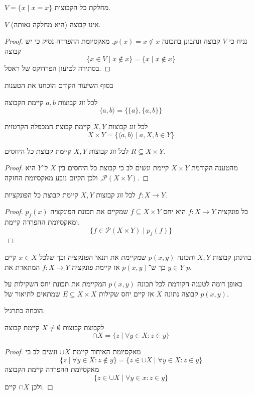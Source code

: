 \begin{notation}
	$V = \{ x \mid x = x \}$ מחלקת כל הקבוצות.
\end{notation}
\begin{proposition}
	$V$ אינו קבוצה (היא מחלקה נאותה).
\end{proposition}
\begin{proof}
	נניח כי $V$ קבוצה ונתבונן בתכונה $p(x) = x \notin x$, מאקסיומת ההפרדה נסיק כי יש קבוצה
	\[
		\{ x \in V \mid x \notin x \} = \{ x \mid x \notin x \}
	\]
	בסתירה לטיעון הפרדוקס של ראסל.
\end{proof}
בסוף השיעור הקודם הוכחנו את הטענות
\begin{proposition}
	לכל זוג קבוצות $a, b$ קיימת הקבוצה
	\[
		\langle a, b \rangle = \{ \{a\}, \{a, b\} \}
	\]
\end{proposition}
\begin{proposition}
	לכל זוג קבוצות $X, Y$ קיימת קבוצת המכפלה הקרטזית
	\[
		X \times Y = \{ \langle a, b \rangle \mid a, X, b \in Y \}
	\]
\end{proposition}
\begin{proposition}
	לכל זוג קבוצות $X, Y$ קיימת קבוצת כל היחסים $R \subseteq X \times Y$.
\end{proposition}
\begin{proof}
	מהטענה הקודמת $X \times Y$ קיימת ונשים לב כי קבוצת כל היחסים בין $X$ ל־$Y$ היא $\mathcal{P}(X \times Y)$, ולכן הקיום נובע מאקסיומת החזקה.
\end{proof}
\begin{proposition}
	לכל זוג קבוצות $X, Y$ קיימת קבוצת כל הפונקציות $f : X \to Y$.
\end{proposition}
\begin{proof}
	כל פונקציה $f : X \to Y$ היא יחס $f \subseteq X \times Y$ שמקיים את תכונת הפונקציה $p_f(x)$ ומאקסיומת ההפרדה קיימת.
	\[
		\{ f \in \mathcal{P}(X \times Y) \mid p_f(f) \}
	\]
\end{proof}
\begin{proposition}
	בהינתן קבוצות $X, Y$ ותכונה $p(x, y)$ שמקיימת את תנאי הפונקציה וכך שלכל $x \in X$ קיים $y \in Y$ כך ש־$p(x, y)$ אז קיימת פונקציה $f : X \to Y$ המתארת את  $p$.
\end{proposition}
\begin{proposition}
	באופן דומה לטענה הקודמת לכל תכונה $p(x, y)$ המקיימת את תכונת יחס השקילות על קבוצה נתונה $X$ אז קיים יחס שקילות $E \subseteq X \times X$ שמתאים לתיאור של $p(x, y)$.
\end{proposition}
הוכחה כתרגיל.
\begin{proposition}
	לקבוצת קבוצות $X \ne \emptyset$ קיימת קבוצה
	\[
		\cap X = \{ z \mid \forall y \in X : z \in y \}
	\]
\end{proposition}
\begin{proof}
	מאקסיומת האיחוד קיימת $\cup X$ ונשים לב כי
	\[
		\{ z \mid \forall y \in X : z \notin y \} = \{ z \in \cup X \mid \forall y \in X : z \in y \}
	\]
	מאקסיומת ההפרדה קיימת הקבוצה
	\[
		\{ z \in \cup X \mid \forall y \in x : z \in y \}
	\]
	ולכן $\cap X$ קיים.
\end{proof}

